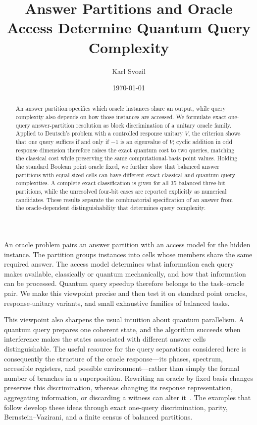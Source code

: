 \documentclass[
  aps,
  prl,
  reprint,
  nofootinbib
]{revtex4-2}
\begin{document}
\title{Answer Partitions and Oracle Access Determine Quantum Query Complexity}

\author{Karl Svozil }

\date{\today}

\begin{abstract}
An answer partition specifies which oracle instances share an output, while
query complexity also depends on how those instances are accessed. We formulate
exact one-query answer-partition resolution as block discrimination of a unitary
oracle family. Applied to Deutsch's problem with a controlled response unitary
\(V\), the criterion shows that one query suffices if and only if \(-1\) is an
eigenvalue of \(V\); cyclic addition in odd response dimension therefore raises
the exact quantum cost to two queries, matching the classical cost while
preserving the same computational-basis point values. Holding the standard
Boolean point oracle fixed, we further show that balanced answer partitions
with equal-sized cells can have different exact classical and quantum query
complexities. A complete exact classification is given for all 35 balanced
three-bit partitions, while the unresolved four-bit cases are reported
explicitly as numerical candidates. These results separate the combinatorial
specification of an answer from the oracle-dependent distinguishability that
determines query complexity.
\end{abstract}

\maketitle

An oracle problem pairs an answer partition with an access model for the hidden
instance. The partition groups instances into cells whose members share the
same required answer. The access model determines what information each query
makes available, classically or quantum mechanically, and how that information
can be processed. Quantum query speedup therefore belongs to the task--oracle
pair. We make this viewpoint precise and then test it on standard point
oracles, response-unitary variants, and small exhaustive families of balanced
tasks.

This viewpoint also sharpens the usual intuition about quantum parallelism. A
quantum query prepares one coherent state, and the algorithm succeeds when
interference makes the states associated with different answer cells
distinguishable. The useful resource for the query separations considered
here is consequently the structure of the oracle response---its phases,
spectrum, accessible registers, and possible environment---rather than simply
the formal number of branches in a superposition. Rewriting an oracle by
fixed basis changes preserves this discrimination, whereas changing its
response representation, aggregating
information, or discarding a witness can alter it~\cite{WojcikChhajlany2006}.
The examples that follow develop these ideas through exact one-query
discrimination, parity, Bernstein--Vazirani, and a finite census of balanced
partitions.
\end{document}
